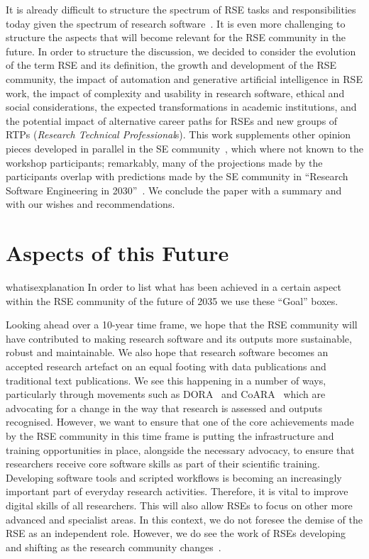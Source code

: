 \documentclass{eceasst}
\begin{document}
It is already difficult to structure the spectrum of RSE tasks and responsibilities
today given the spectrum of research software~\cite{Hasselbring2024}.
It is even more challenging to structure the aspects that will become relevant for the RSE community in the future.
In order to structure the discussion, we decided to consider
the evolution of the term RSE and its definition,
the growth and development of the RSE community,
the impact of automation and generative artificial intelligence in RSE work,
the impact of complexity and usability in research software,
ethical and social considerations,
the expected transformations in academic institutions,
and the potential impact of alternative career paths for RSEs
and new groups of RTPs (\emph{Research Technical Professional}s).
This work supplements other opinion pieces developed in parallel
in the SE community~\cite{ChueHong2025,Sochat2024Infra,Bencomo2024AEBoK,OliveiraJr2024,Druskat2025,Carleton2022},
which where not known to the workshop participants; remarkably,
many of the projections made by the participants overlap with predictions made
by the SE community in ``Research Software Engineering in 2030''~\cite{Katz2023}.
We conclude the paper with a summary and with our wishes and recommendations.

\section{Aspects of this Future}
\begin{whatis}{}{whatisexplanation}
In order to list what has been achieved in a certain aspect within the RSE community of the future of 2035 we use these ``Goal'' boxes.
\end{whatis}

Looking ahead over a 10-year time frame, we hope that the RSE community will have
contributed to making research software and its outputs
more sustainable, robust and maintainable.
We also hope that research software becomes an accepted research artefact on an equal footing with data publications and traditional text publications.
We see this happening in a number of ways,
particularly through movements such as DORA~\cite{DORA} and CoARA~\cite{COARA} which are advocating for a change in the way that research is assessed and outputs recognised.
However, we want to ensure that one of the core achievements made by the RSE community in this time
frame is putting the infrastructure and training opportunities in place, alongside the necessary
advocacy, to ensure that researchers receive core software skills as part of their scientific training.
Developing software tools and scripted workflows is becoming an increasingly important part of everyday
research activities.
Therefore, it is vital to improve digital skills of all researchers.
This will also allow RSEs to focus on other more advanced and specialist areas.
In this context, we do not foresee the demise of the RSE as an independent role.
However, we do see the work of RSEs developing and shifting as the research community changes~\cite{ChueHong2025}.
\end{document}
